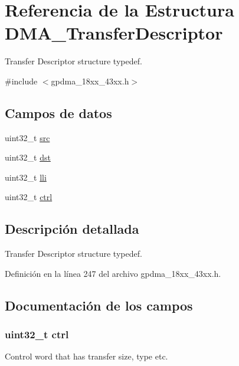 \hypertarget{struct_d_m_a___transfer_descriptor}{}\section{Referencia de la Estructura D\+M\+A\+\_\+\+Transfer\+Descriptor}
\label{struct_d_m_a___transfer_descriptor}


Transfer Descriptor structure typedef.  




{\ttfamily \#include $<$gpdma\+\_\+18xx\+\_\+43xx.\+h$>$}

\subsection*{Campos de datos}
\begin{DoxyCompactItemize}
\item 
uint32\+\_\+t \hyperlink{struct_d_m_a___transfer_descriptor_a0d6d2cdb1162c6355e40ab772fa5debc}{src}
\item 
uint32\+\_\+t \hyperlink{struct_d_m_a___transfer_descriptor_aa8b6a0c5900928c04c0cb42248821ce5}{dst}
\item 
uint32\+\_\+t \hyperlink{struct_d_m_a___transfer_descriptor_a76f31eac518fe9f46e705a8a9610b12c}{lli}
\item 
uint32\+\_\+t \hyperlink{struct_d_m_a___transfer_descriptor_a6b78d29adca390bd7470d86e41a59077}{ctrl}
\end{DoxyCompactItemize}


\subsection{Descripción detallada}
Transfer Descriptor structure typedef. 

Definición en la línea 247 del archivo gpdma\+\_\+18xx\+\_\+43xx.\+h.



\subsection{Documentación de los campos}
\subsubsection[{\texorpdfstring{ctrl}{ctrl}}]{\setlength{\rightskip}{0pt plus 5cm}uint32\+\_\+t ctrl}\hypertarget{struct_d_m_a___transfer_descriptor_a6b78d29adca390bd7470d86e41a59077}{}\label{struct_d_m_a___transfer_descriptor_a6b78d29adca390bd7470d86e41a59077}
Control word that has transfer size, type etc. 

